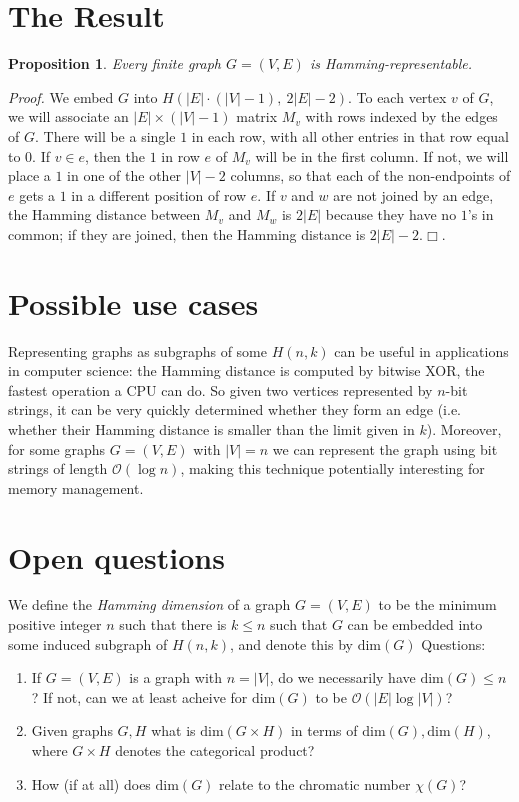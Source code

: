 \documentclass[12pt, a4paper]{amsart}
\newtheorem{proposition}[lemma]{\bf Proposition}
\begin{document}
\section{The Result}
\begin{proposition}\label{mainprop} Every finite graph $G=(V,E)$ is Hamming-re\-pre\-sen\-ta\-ble.\end{proposition}
{\it Proof.}  We embed $G$ into $H(|E|\cdot(|V|-1),\ 2|E|-2)$. To each vertex $v$ of $G$, we will associate an $|E| \times (|V|-1)$ matrix $M_v$ with rows indexed by the edges of $G$. There will be a single $1$ in each row, with all other entries in that row equal to $0$.
If $v \in e$, then the $1$ in row $e$ of $M_v$ will be in the first column. If not, we will place a $1$ in one of the other $|V|-2$ columns, so that each of the non-endpoints of $e$ gets a $1$ in a different position of row $e$. 
If $v$ and $w$ are not joined by an edge, the Hamming distance between $M_v$ and $M_w$ is $2 |E|$ because they have no $1$'s in common; if they are joined, then the Hamming distance is $2|E|-2$.\hfill{$\Box$}.
\section{Possible use cases}
Representing graphs as subgraphs of some $H(n,k)$ can be 
useful in applications in computer science:  the
Hamming distance is computed by bitwise XOR, the
fastest operation a CPU can do. So given two
vertices represented by $n$-bit strings, it can be very quickly
determined whether they form an edge (i.e. whether their
Hamming distance is smaller than the limit given in $k$). 
Moreover, for some graphs $G=(V,E)$ with $|V|=n$ we can
represent the graph using bit strings of length ${\mathcal O}(\log n)$, making this technique potentially interesting 
for memory management.
\section{Open questions}
We define the {\em Hamming dimension} of a graph $G=(V,E)$
to be the minimum positive integer $n$ such that there is
$k\leq n$ such that $G$ can be embedded into some induced
subgraph of $H(n,k)$, and denote this by $\mathrm{dim}(G)$ Questions:
\begin{enumerate}
    \item If $G=(V,E)$ is a graph with $n=|V|$, do we necessarily have $\mathrm{dim}(G)\leq n$? If not, can we at least acheive for $\mathrm{dim}(G)$ to be ${\mathcal O}(|E|\log |V|)$?
    \item Given graphs $G,H$ what is $\mathrm{dim}(G\times H)$ in terms of $\mathrm{dim}(G), \mathrm{dim}(H)$, where $G\times H$ denotes the categorical product?
    \item How (if at all) does $\mathrm{dim}(G)$ relate to
    the chromatic number $\chi(G)$?
\end{enumerate}
\end{document}
